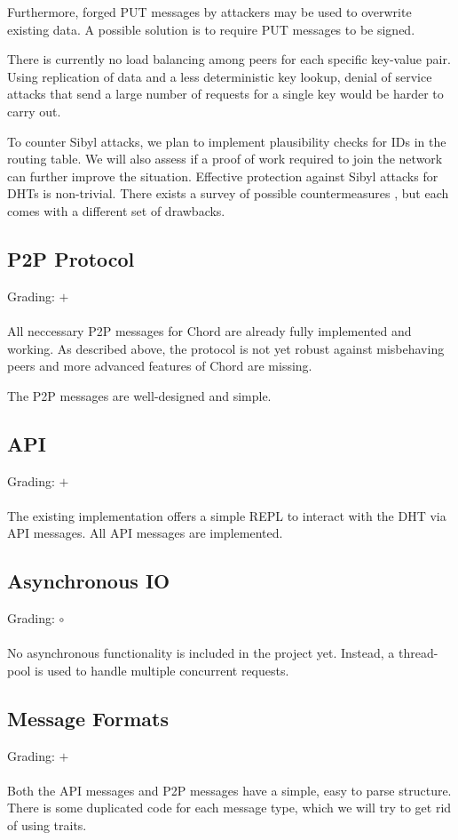 \documentclass[a4paper, 11pt]{article}
\begin{document}
Furthermore, forged PUT messages by attackers may be used to overwrite existing data.
A possible solution is to require PUT messages to be signed.

There is currently no load balancing among peers for each specific key-value pair. 
Using replication of data and a less deterministic key lookup, denial of service attacks that send a large number of requests for a single key would be harder to carry out.

To counter Sibyl attacks, we plan to implement plausibility checks for IDs in the routing table.
We will also assess if a proof of work required to join the network can further improve the situation.
Effective protection against Sibyl attacks for DHTs is non-trivial.
There exists a survey of possible countermeasures \cite{urdaneta2011survey}, but each comes with a different set of drawbacks.

\subsection*{P2P Protocol}
Grading: $+$\\
\\
All neccessary P2P messages for Chord are already fully implemented and working.
As described above, the protocol is not yet robust against misbehaving peers and more advanced features of Chord are missing. 

The P2P messages are well-designed and simple.


\subsection*{API}
Grading: $+$\\
\\
The existing implementation offers a simple REPL to interact with the DHT via API messages.
All API messages are implemented.

\subsection*{Asynchronous IO}
Grading: $\circ$\\
\\
No asynchronous functionality is included in the project yet.
Instead, a thread-pool is used to handle multiple concurrent requests.


\subsection*{Message Formats}
Grading: $+$\\
\\
Both the API messages and P2P messages have a simple, easy to parse structure.
There is some duplicated code for each message type, which we will try to get rid of using traits.
\end{document}
